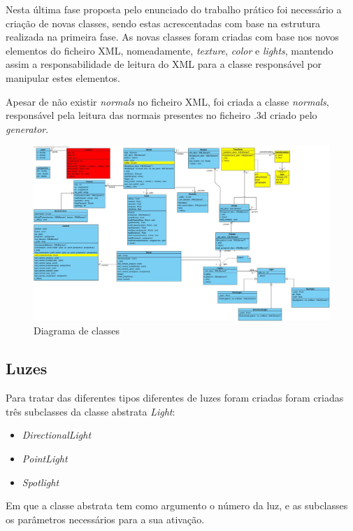 \documentclass[relatorio.tex]{subfiles}
\begin{document}
Nesta última fase proposta pelo enunciado do trabalho prático foi necessário a 
criação de novas classes, sendo estas acrescentadas com base na estrutura realizada
na primeira fase. As novas classes foram criadas com base nos novos elementos do ficheiro
XML, nomeadamente, \textit{texture}, \textit{color} e \textit{lights}, mantendo assim a 
responsabilidade de leitura do XML para a classe responsável por manipular estes elementos.

Apesar de não existir \textit{normals} no ficheiro XML, foi criada a classe \textit{normals},
responsável pela leitura das normais presentes no ficheiro .3d criado pelo \textit{generator}.

\begin{landscape}
    \begin{figure}
        \centering
        \includegraphics[width=\linewidth]{assets/classe.jpg}
        \caption{Diagrama de classes} \label{fig:dig_classes}
    \end{figure}
\end{landscape}

\subsection{Luzes}
Para tratar das diferentes tipos diferentes de luzes foram criadas foram criadas
três subclasses da classe abstrata \textit{Light}:
\begin{itemize}
    \item \textit{DirectionalLight}
    \item \textit{PointLight}
    \item \textit{Spotlight}
\end{itemize}

Em que a classe abstrata tem como argumento o número da luz, e as subclasses os
parâmetros necessários para a sua ativação.
\end{document}
